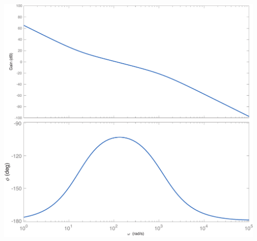 \documentclass[10pt,fleqn]{article} %
\begin{document}
\begin{multicols}{2}
\begin{center}
\includegraphics[width=1.0\linewidth]{images/matlab/bode_pid.pdf}
\end{center}



\end{multicols}
\end{document}
